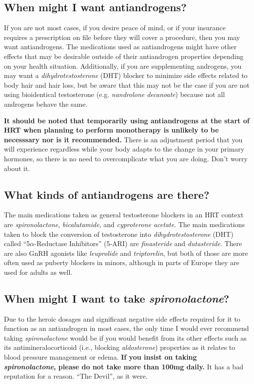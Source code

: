 \documentclass{article}
\begin{document}
\subsection{When might I want antiandrogens?}

If you are not most cases, if you desire peace of mind, or if your insurance requires a prescription on file before they will cover a procedure, then you may want antiandrogens. The medications used as antiandrogens might have other effects that may be desirable outside of their antiandrogen properties depending on your health situation. Additionally, if you are supplementing androgens, you may want a \textit{dihydrotestosterone} (DHT) blocker to minimize side effects related to body hair and hair loss, but be aware that this may not be the case if you are not using bioidentical testosterone (e.g. \textit{nandrolone decanoate}) because not all androgens behave the same.

\textbf{It should be noted that temporarily using antiandrogens at the start of HRT when planning to perform monotherapy is unlikely to be necesssary nor is it recommended.} There is an adjustment period that you will experience regardless while your body adapts to the change in your primary hormones, so there is no need to overcomplicate what you are doing. Don't worry about it.

\subsection{What kinds of antiandrogens are there?}

The main medications taken as general testosterone blockers in an HRT context are \textit{spironolactone}, \textit{bicalutamide}, and \textit{cyproterone acetate}. The main medications taken to block the conversion of testosterone into \textit{dihydrotestosterone} (DHT) called “5$\alpha$-Reductase Inhibitors” (5-ARI) are \textit{finasteride} and \textit{dutasteride}. There are also GnRH agonists like \textit{leuprolide} and \textit{triptorelin}, but both of those are more often used as puberty blockers in minors, although in parts of Europe they are used for adults as well.

\subsection{When might I want to take \textit{spironolactone}?}

Due to the heroic dosages and significant negative side effects required for it to function as an antiandrogen in most cases, the only time I would ever recommend taking \textit{spironolactone} would be if you would benefit from its other effects such as its antimineralocorticoid (i.e., blocking \textit{aldosterone}) properties as it relates to blood pressure management or edema. \textbf{If you insist on taking \textit{spironolactone}, please do not take more than 100mg daily.} It has a bad reputation for a reason. “The Devil”, as it were.
\end{document}
